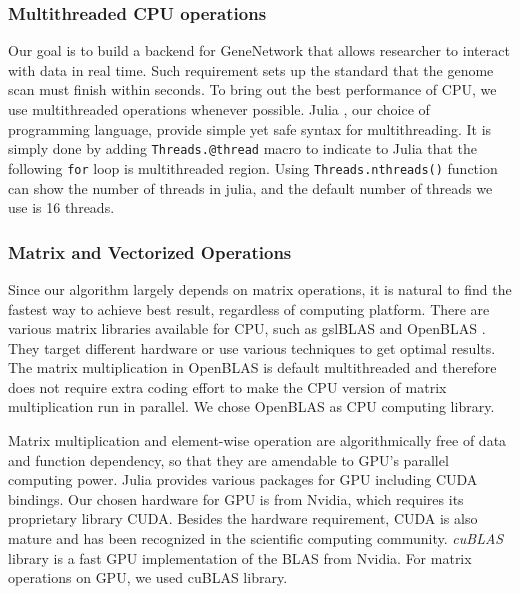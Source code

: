 \documentclass[9pt,twocolumn,twoside,lineno]{gsag3jnl}
\newcommand{\code}{\texttt}
\begin{document}
\subsubsection{Multithreaded CPU operations}
 Our goal is to build a backend for GeneNetwork that allows researcher to interact with data in real time. 
 Such requirement sets up the standard that the genome scan must finish within seconds.
 To bring out the best performance of CPU, we use multithreaded operations whenever possible. 
 Julia \citep{bezanson2017julia}, our choice of programming language, provide simple yet safe syntax for multithreading. 
 It is simply done by adding \code{Threads.@thread} macro to indicate to Julia that the following \code{for} loop is multithreaded region. 
 Using \code{Threads.nthreads()} function can show the number of threads in julia, and the default number of threads we use is 16 threads. 
  
 
\subsubsection{Matrix and Vectorized Operations}

Since our algorithm largely depends on matrix operations, it is natural to find the fastest way to achieve best result, regardless of computing platform. 
There are various matrix libraries available for CPU, such as gslBLAS and OpenBLAS \citep{wang2013augem}. 
They target different hardware or use various techniques to get optimal results. 
The matrix multiplication in OpenBLAS is default multithreaded and therefore does not require extra coding effort to make the CPU version of matrix multiplication run in parallel.
We chose OpenBLAS as CPU computing library.  

Matrix multiplication and element-wise operation are algorithmically free of data and function dependency, so that they are amendable to GPU's parallel computing power.
Julia provides various packages for GPU including CUDA \citep{Nickolls:2008:SPP:1365490.1365500} bindings. 
Our chosen hardware for GPU is from Nvidia, which requires its proprietary library CUDA. 
Besides the hardware requirement, CUDA is also mature and has been recognized in the scientific computing community. 
\textit{cuBLAS} \citep{cublas} library is a fast GPU implementation of the BLAS from Nvidia. 
For matrix operations on GPU, we used cuBLAS library. 
\end{document}
